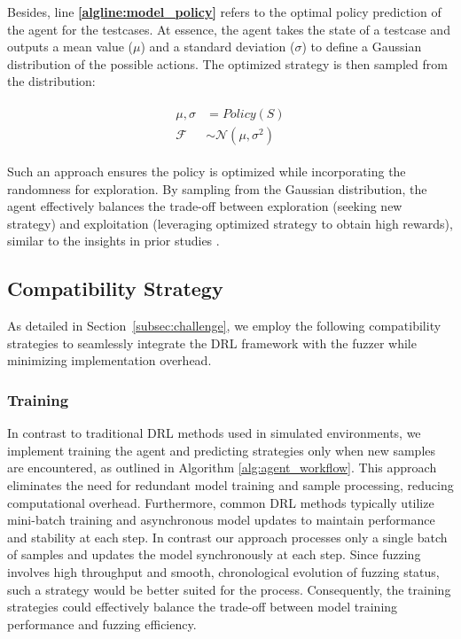\documentclass[lettersize,journal]{IEEEtran}
\begin{document}
Besides, line \textbf{\ref{algline:model_policy}} refers to the optimal policy prediction of the agent for the testcases. At essence, the agent takes the state of a testcase and outputs a mean value ($\mu$) and a standard deviation ($\sigma$) to define a Gaussian distribution of the possible actions. The optimized strategy is then sampled from the distribution:

\begin{align} 
	\begin{split}
		\mu, \sigma &= \textit{Policy}(S) \\ 
		\mathcal{F} &\sim \mathcal{N}(\mu, \sigma^2) 
	\end{split}
\end{align}

Such an approach ensures the policy is optimized while incorporating the randomness for exploration. By sampling from the Gaussian distribution, the agent effectively balances the trade-off between exploration (seeking new strategy) and exploitation (leveraging optimized strategy to obtain high rewards), similar to the insights in prior studies \cite{jauernigDARWINSurvivalFittest2023}.

\subsection{Compatibility Strategy}
As detailed in Section \ref{subsec:challenge}, we employ the following compatibility strategies to seamlessly integrate the DRL framework with the fuzzer while minimizing implementation overhead.

\subsubsection{Training}
In contrast to traditional DRL methods used in simulated environments, we implement training the agent and predicting strategies only when new samples are encountered, as outlined in Algorithm \ref{alg:agent_workflow}. This approach eliminates the need for redundant model training and sample processing, reducing computational overhead. Furthermore, common DRL methods typically utilize mini-batch training and asynchronous model updates to maintain performance and stability at each step. In contrast our approach processes only a single batch of samples and updates the model synchronously at each step. Since fuzzing involves high throughput and smooth, chronological evolution of fuzzing status, such a strategy would be better suited for the process. Consequently, the training strategies could effectively balance the trade-off between model training performance and fuzzing efficiency.
\end{document}
